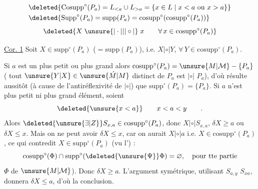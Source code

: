 \[
\begin{aligned}
 &\deleted{\mathrm{Cosupp}^{\circ}(P_a)=L_{<a}\cup L_{>a}=\{x\in L\mid x<a\text{ ou }x>a\}}\\
 &\deleted{\mathrm{Supp}^{\circ}(P_a)=\mathrm{supp}(P_a)=\mathrm{cosupp}^{\circ}(\mathrm{cosupp}^{\circ}(P_a))}
\end{aligned}
\]
\[
 \deleted{X\mathrel{\unsure{\vert\cdot\vert|\vert\circ\vert}}x\qquad\forall\,x\in\mathrm{cosupp}^{\circ}(P_a)}
\]

\uline{Cor. 1} Soit $X\in\mathrm{supp}^{\circ}(P_a)$ ($=\mathrm{supp}(P_a)$), i.e. $X\mathrel{|\circ|}Y$, $\forall\,Y\in\mathrm{cosupp}^{\circ}(P_a)$.

Si $a$ est un plus petit ou plus grand  alors $\mathrm{cosupp}^{\circ}(P_a)=\unsure{M|\mathcal M}-\{P_a\}$ ( tout $\unsure{Y|X}\in\unsure{\acute M|M}$
distinct de $P_a$ est $\mathrel{|\circ|}$  $P_a$), d'où résulte aussitôt (à cause de l'antiréflexivité de $\mathrel{|\circ|}$) que $\mathrm{supp}^{\circ}(P_a)=\{P_a\}$. Si $a$ n'est  plus petit ni plus grand élément, soient
\[
 \deleted{\unsure{x<a}}\qquad x<a<y\qquad .
\]
Alors $\deleted{\unsure{\exists|Z}}S_{x,a}\in\mathrm{cosupp}^{\circ}(P_a)$, donc $X\mathrel{|\circ|}S_{x,a}$,  $\delta X\geq a$ ou $\delta X\leq x$. Mais on ne peut avoir $\delta X\leq x$, car on aurait $X\mathrel{|\circ|}a$ i.e. $X\in\mathrm{cosupp}^{\circ}(P_a)$, ce qui contredit $X\in\mathrm{supp}^{\circ}(P_a)$ (vu l') :
\[
 \mathrm{cosupp}^{\circ}(\Phi)\cap\mathrm{supp}^{\circ}(\deleted{\unsure{\Psi}}\Phi)=\varnothing,\quad\text{pour tte partie}
\]
$\Phi$ de $\unsure{M|\mathcal M}$). Donc $\delta X\geq a$. L'argument symétrique, utilisant $S_{a,y}$  $S_{xa}$, donnera $\delta X\leq a$, d'où la conclusion.

